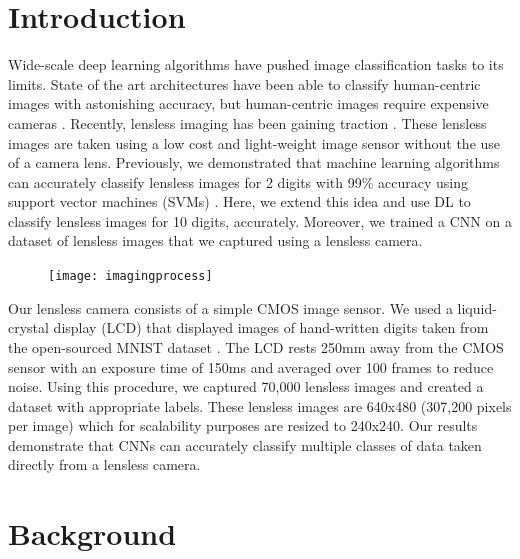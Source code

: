 \documentclass[11pt,conference]{ieeeconf}
\begin{document}
\section{Introduction}
Wide-scale deep learning algorithms have pushed image classification tasks to its limits. State of the art architectures have been able to classify human-centric images with astonishing accuracy, but human-centric images require expensive cameras \cite{DBLP:journals/corr/SimonyanZ14a, DBLP:journals/corr/SzegedyIV16}. Recently, lensless imaging has been gaining traction \cite{DBLP:journals/corr/AsifASVB15, Gill:13, DBLP:journals/corr/KimIPM17}. These lensless images are taken using a low cost and light-weight image sensor without the use of a camera lens. Previously, we demonstrated that machine learning algorithms can accurately classify lensless images for 2 digits with 99\% accuracy using support vector machines (SVMs) \cite{DBLP:journals/corr/abs-1709-00408}. Here, we extend this idea and use DL to classify lensless images for 10 digits, accurately. Moreover, we trained a CNN on a dataset of lensless images that we captured using a lensless camera.
%
\begin{figure}[H]
\centering
\texttt{[image: imagingprocess]}
\caption{}\label{section2_3}
\end{figure}
%
Our lensless camera consists of a simple CMOS image sensor. We used a liquid-crystal display (LCD) that displayed images of hand-written digits taken from the open-sourced MNIST dataset \cite{lecun-mnisthandwrittendigit-2010}. The LCD rests 250mm away from the CMOS sensor with an exposure time of 150ms and averaged over 100 frames to reduce noise. Using this procedure, we captured 70,000 lensless images and created a dataset with appropriate labels. These lensless images are 640x480 (307,200 pixels per image) which for scalability purposes are resized to 240x240.
%
Our results demonstrate that CNNs can accurately classify multiple classes of data taken directly from a lensless camera.
%
\section{Background}
%
\end{document}
